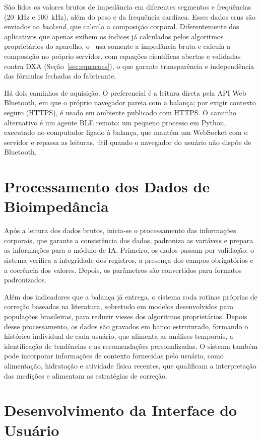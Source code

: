 São lidos os valores brutos de impedância em diferentes segmentos e frequências (20~kHz e
100~kHz), além do peso e da frequência cardíaca. Esses dados crus são enviados ao
\emph{backend}, que calcula a composição corporal. Diferentemente dos aplicativos que
apenas exibem os índices já calculados pelos algoritmos proprietários do aparelho, o
\sintonia\ usa somente a impedância bruta e calcula a composição no próprio servidor, com
equações científicas abertas e validadas contra DXA (Seção~\ref{sec:equacoes}), o que
garante transparência e independência das fórmulas fechadas do fabricante.

Há dois caminhos de aquisição. O preferencial é a leitura direta pela API Web Bluetooth, em
que o próprio navegador pareia com a balança; por exigir contexto seguro (HTTPS), é usado
em ambiente publicado com HTTPS. O caminho alternativo é um agente BLE remoto: um pequeno
processo em Python, executado no computador ligado à balança, que mantém um WebSocket com o
servidor e repassa as leituras, útil quando o navegador do usuário não dispõe de Bluetooth.

\section{Processamento dos Dados de Bioimpedância}

Após a leitura dos dados brutos, inicia-se o processamento das informações corporais, que
garante a consistência dos dados, padroniza as variáveis e prepara as informações para o
módulo de IA. Primeiro, os dados passam por validação: o sistema verifica a integridade dos
registros, a presença dos campos obrigatórios e a coerência dos valores. Depois, os
parâmetros são convertidos para formatos padronizados.

Além dos indicadores que a balança já entrega, o sistema roda rotinas próprias de correção
baseadas na literatura, sobretudo em modelos desenvolvidos para populações brasileiras,
para reduzir vieses dos algoritmos proprietários. Depois desse processamento, os dados são
gravados em banco estruturado, formando o histórico individual de cada usuário, que alimenta
as análises temporais, a identificação de tendências e as recomendações personalizadas. O
sistema também pode incorporar informações de contexto fornecidas pelo usuário, como
alimentação, hidratação e atividade física recentes, que qualificam a interpretação das
medições e alimentam as estratégias de correção.

\section{Desenvolvimento da Interface do Usuário}

